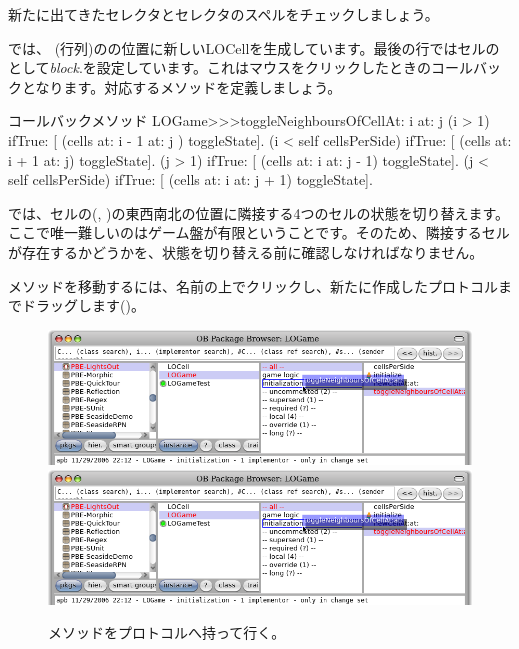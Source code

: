 \documentclass[a4paper,10pt,twoside]{book}
\begin{document}

新たに出てきたセレクタとセレクタのスペルをチェックしましょう。

 では、 (行列)のの位置に新しいLOCellを生成しています。最後の行ではセルのとして\emph{block}\mbox{.}を設定しています。これはマウスをクリックしたときのコールバックとなります。対応するメソッドを定義しましょう。

\begin{method}[toggleNeighboursOfCellAt:at:]{コールバックメソッド}
LOGame>>>toggleNeighboursOfCellAt: i at: j
   (i > 1) ifTrue: [ (cells at: i - 1 at: j ) toggleState].
   (i < self cellsPerSide) ifTrue: [ (cells at: i + 1 at: j) toggleState].
   (j > 1) ifTrue: [ (cells at: i  at: j - 1) toggleState].
   (j < self cellsPerSide) ifTrue: [ (cells at: i at: j + 1) toggleState].
\end{method}

 では、セルの(, )の東西南北の位置に隣接する4つのセルの状態を切り替えます。ここで唯一難しいのはゲーム盤が有限ということです。そのため、隣接するセルが存在するかどうかを、状態を切り替える前に確認しなければなりません。


メソッドを移動するには、名前の上でクリックし、新たに作成したプロトコルまでドラッグします()。

\begin{figure}[htbp]
   \centering
   \ifluluelse
		{\includegraphics[width=\textwidth]{DragMethod} }
		{\includegraphics[scale=0.7]{DragMethod} }
   \caption{メソッドをプロトコルへ持って行く。}
\end{figure}
\end{document}
